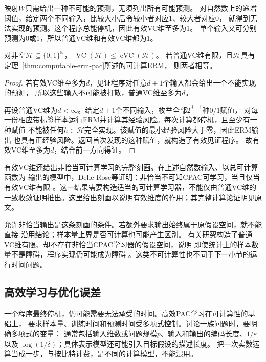 映射$W$只需给出一种不可能的预测，无须列出所有可能预测。
对自然数上的递增阈值，给定两个不同输入，比较大小后令较小者对应1、较大者对应0，
就得到无法实现的预测。这个程序总能停机，因此有效VC维至多为1。
单个输入又可分别预测为0或1，所以普通VC维和有效VC维都为1。

\begin{theorem}[普通VC维与有效VC维的比较]
\label{thm:effective-vc-comparison}
对非空$\mathcal H\subseteq\{0,1\}^{\mathbb N}$，
$\operatorname{VC}(\mathcal H)\leq\operatorname{eVC}(\mathcal H)$。
若普通VC维有限，且$\mathcal H$具有定理~\ref{thm:computable-erm-pac}所述的可计算ERM，
则两者相等。
\end{theorem}

\begin{proof}
若有效VC维至多为$d$，见证程序对任意$d+1$个输入都会给出一个不能实现的预测，
所以这些输入不可能被打散，普通VC维至多为$d$。

再设普通VC维为$d<\infty$。给定$d+1$个不同输入，枚举全部$2^{d+1}$种0/1赋值，
对每一份相应带标签样本运行ERM并计算其经验风险。每次计算都停机，且至少有一种赋值
不能被任何$h\in\mathcal H$完全实现。该赋值的最小经验风险大于零，因此ERM输出
也具有正经验风险。返回首次发现的这种赋值，就构造了有效见证程序。
故有效VC维至多为$d$，结合前一方向得证。
\end{proof}

有效VC维还给出非恰当可计算学习的完整刻画。在上述自然数输入、以总可计算函数为
输出的模型中，Delle Rose等证明：非恰当不可知CPAC可学习，当且仅当有效VC维有限
。这一结果需要构造适当的可计算学习器，不能仅由普通VC维的
一致收敛证明推出。这里给出刻画以说明有效维度的作用；其完整计算论证明见原文。

允许非恰当输出是这条刻画的条件。若额外要求输出始终属于原假设空间，就不能直接
沿用结论；样本量上界是否可计算也可能产生区别。
有关研究构造了普通VC维有限、却不存在非恰当CPAC学习器的假设空间，说明
即使统计上的样本数量不是障碍，程序实现仍可能成为障碍
。这类不可计算性也不同于下一小节的运行时间问题。

\subsection{高效学习与优化误差}

一个程序最终停机，仍可能需要无法承受的时间。高效PAC学习在可计算性的基础上，
要求样本量、训练时间和预测时间受多项式控制。讨论一族问题时，要明确多项式的变量：
通常包括输入维数或问题规模$p$、输入和输出的编码长度、$1/\varepsilon$以及
$\log(1/\delta)$；具体表示模型还可能引入目标假设的描述长度。
把一次实数运算当成一步，与按比特计费，是不同的计算模型，不能混用。

